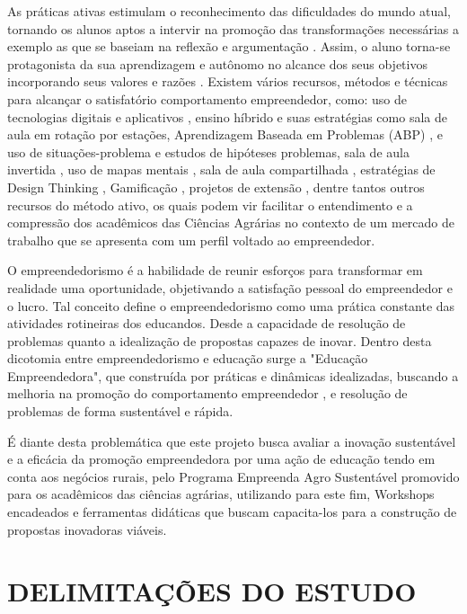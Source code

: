 As práticas ativas estimulam o reconhecimento das dificuldades do mundo atual, tornando os alunos aptos a intervir na promoção das transformações necessárias a exemplo as que se baseiam  na reflexão e argumentação \cite{bezanilla_methodologies_2019}. Assim, o aluno torna-se protagonista da sua aprendizagem e autônomo no alcance dos seus objetivos incorporando seus valores e razões \cite{rubel_student_2016}. Existem vários recursos, métodos e técnicas para alcançar o satisfatório comportamento empreendedor, como: uso de tecnologias digitais e aplicativos \cite{pereira_use_2020}, ensino híbrido e suas estratégias como sala de aula em rotação por estações, Aprendizagem Baseada em Problemas (ABP) \cite{souza_aprendizagem_2015}, e uso de situações-problema e estudos de hipóteses problemas, sala de aula invertida \cite{junior_sala_2016,branco_sala_2016}, uso de mapas mentais \cite{junior_percepcao_2018}, sala de aula compartilhada \cite{strack_por_2009}, estratégias de Design Thinking \cite{andrews_circular_2015}, Gamificação \cite{ogawa_avaliacao_2016}, projetos de extensão \cite{garcia_contribuicao_2012}, dentre tantos outros recursos do método ativo, os quais podem vir facilitar o entendimento e a compressão dos acadêmicos das Ciências Agrárias no contexto de um mercado de trabalho que se apresenta com um perfil voltado ao empreendedor.

O empreendedorismo é a habilidade de reunir esforços para transformar em realidade uma oportunidade, objetivando a satisfação pessoal do empreendedor e o lucro. Tal conceito define o empreendedorismo como uma prática constante das atividades rotineiras dos educandos. Desde a capacidade de resolução de problemas quanto a idealização de propostas capazes de inovar. Dentro desta dicotomia entre empreendedorismo e educação surge a "Educação Empreendedora", que construída por práticas e dinâmicas idealizadas, buscando a melhoria na promoção do comportamento empreendedor \cite{martins_educacao_2016, morais_empreendedorismo_2018}, e resolução de problemas de forma sustentável e rápida.

É diante desta problemática que este projeto busca avaliar a inovação sustentável e a eficácia da promoção empreendedora por uma ação de educação tendo em conta aos negócios rurais, pelo Programa Empreenda Agro Sustentável promovido para os acadêmicos das ciências agrárias, utilizando para este fim, Workshops encadeados e ferramentas didáticas que buscam capacita-los para a construção de propostas inovadoras viáveis.


\section{DELIMITAÇÕES DO ESTUDO}


